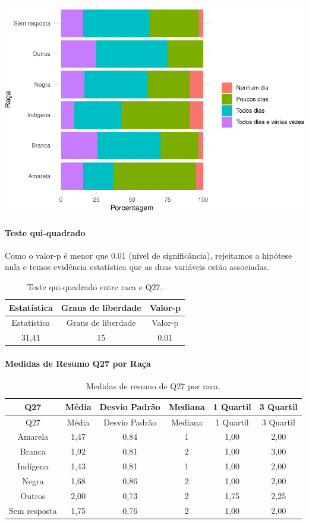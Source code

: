 \documentclass[]{article}
\let\oldparagraph\paragraph
\renewcommand{\paragraph}[1]{\oldparagraph{#1}\mbox{}}
\begin{document}
\begin{center}\includegraphics[width=0.75\linewidth]{relatorio_covid19_files/figure-latex/unnamed-chunk-811-1} \end{center}

\hypertarget{teste-qui-quadrado-70}{%
\paragraph{Teste qui-quadrado}\label{teste-qui-quadrado-70}}

Como o valor-p é menor que 0.01 (nível de significância), rejeitamos a hipótese nula e temos evidência estatística que as duas variáveis estão associadas.

\begin{longtable}[]{@{}ccc@{}}
\caption{\label{tab:unnamed-chunk-813}Teste qui-quadrado entre raca e Q27.}\tabularnewline
\toprule
Estatística & Graus de liberdade & Valor-p\tabularnewline
\midrule
\endfirsthead
\toprule
Estatística & Graus de liberdade & Valor-p\tabularnewline
\midrule
\endhead
31,41 & 15 & 0,01\tabularnewline
\bottomrule
\end{longtable}

\cleardoublepage

\hypertarget{medidas-de-resumo-q27-por-rauxe7a}{%
\paragraph{Medidas de Resumo Q27 por Raça}\label{medidas-de-resumo-q27-por-rauxe7a}}

\begin{longtable}[]{@{}cccccc@{}}
\caption{\label{tab:unnamed-chunk-814}Medidas de resumo de Q27 por raca.}\tabularnewline
\toprule
Q27 & Média & Desvio Padrão & Mediana & 1 Quartil & 3 Quartil\tabularnewline
\midrule
\endfirsthead
\toprule
Q27 & Média & Desvio Padrão & Mediana & 1 Quartil & 3 Quartil\tabularnewline
\midrule
\endhead
Amarela & 1,47 & 0,84 & 1 & 1,00 & 2,00\tabularnewline
Branca & 1,92 & 0,81 & 2 & 1,00 & 3,00\tabularnewline
Indígena & 1,43 & 0,81 & 1 & 1,00 & 2,00\tabularnewline
Negra & 1,68 & 0,86 & 2 & 1,00 & 2,00\tabularnewline
Outros & 2,00 & 0,73 & 2 & 1,75 & 2,25\tabularnewline
Sem resposta & 1,75 & 0,76 & 2 & 1,00 & 2,00\tabularnewline
\bottomrule
\end{longtable}
\end{document}
